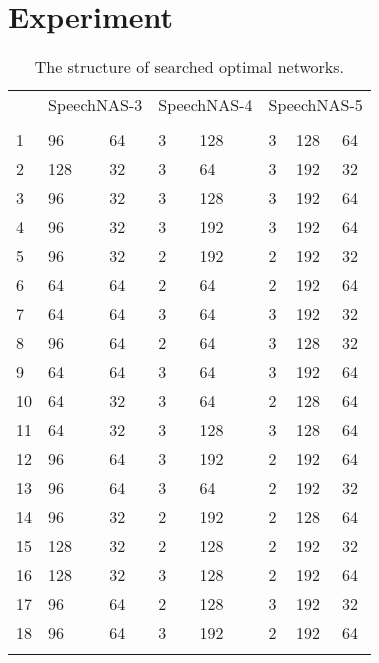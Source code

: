 \documentclass{article}
\begin{document}
\section{Experiment}\label{sec:exper}
\begin{table}[t]
  \caption{The structure of searched optimal networks.}
  \centering
  \begin{tabular}{l|ll|ll|lll}
  \Xhline{2\arrayrulewidth}
    \multirow{2}{*}{Layer} & \multicolumn{2}{c|}{SpeechNAS-3} & \multicolumn{2}{c|}{SpeechNAS-4} & \multicolumn{3}{c}{SpeechNAS-5} \\
    \cline{2-8}
    & & & & & & & \\
    \Xhline{1.5\arrayrulewidth}
    1 & 96 & 64 &3 &128 & 3 & 128 & 64 \\
    2 & 128 & 32 &3 &64 & 3 & 192 & 32 \\
    3 & 96 & 32 &3 &128 & 3 & 192 & 64 \\
    4 & 96 & 32 &3 &192 & 3 & 192 & 64 \\ \hline
    5 & 96 & 32 &2 &192 & 2 & 192 & 32 \\
    6 & 64 & 64 &2 &64 & 2 & 192 & 64 \\
    7 & 64 & 64 &3 &64 & 3 & 192 & 32 \\
    8 & 96 & 64 &2 &64 & 3 & 128 & 32 \\
    9 & 64 & 64 &3 &64 & 3 & 192 & 64 \\
    10 & 64 & 32 &3 &64 & 2 & 128 & 64 \\
    11 & 64 & 32 &3 &128 & 3 & 128 & 64 \\
    12 & 96 & 64 &3 &192 & 2 & 192 & 64 \\
    13 & 96 & 64 &3 &64 & 2 & 192 & 32 \\
    14 & 96 & 32 &2 &192 & 2 & 128 & 64 \\
    15 & 128 & 32 &2 &128 & 2 & 192 & 32 \\
    16 & 128 & 32 &3 &128 & 2 & 192 & 64 \\
    17 & 96 & 64 &2 &128 & 3 & 192 & 32 \\
    18 & 96 & 64 &3 &192 & 2 & 192 & 64 \\
    \Xhline{2\arrayrulewidth}
  \end{tabular}\label{tab:network}
\end{table}
\end{document}
